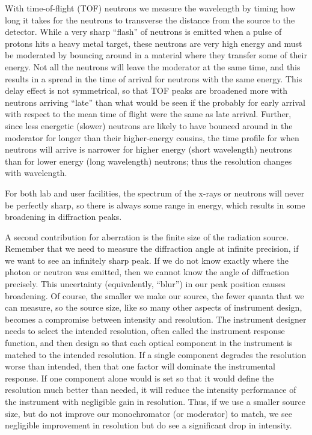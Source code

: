  With time-of-flight (TOF) neutrons we measure the wavelength by timing how long it takes for the neutrons to transverse the distance from the source to the detector. While a very sharp “flash” of neutrons is emitted when a pulse of protons hits a heavy metal target, these neutrons are very high energy and must be moderated by bouncing around in a material where they transfer some of their energy. Not all the neutrons will leave the moderator at the same time, and this results in a spread in the time of arrival for neutrons with the same energy. This delay effect is not symmetrical, so that TOF peaks are broadened more with neutrons arriving “late” than what would be seen if the probably for early arrival with respect to the mean time of flight were the same as late arrival. Further, since less energetic (slower) neutrons are likely to have bounced around in the moderator for longer than their higher-energy cousins, the time profile for when neutrons will arrive is narrower for higher energy (short wavelength) neutrons than for lower energy (long wavelength) neutrons; thus the resolution changes with wavelength.

 For both lab and user facilities, the spectrum of the x-rays or neutrons will never be perfectly sharp, so there is always some range in energy, which results in some broadening in diffraction peaks.

 A second contribution for aberration is the finite size of the radiation source. Remember that we need to measure the diffraction angle at infinite precision, if we want to see an infinitely sharp peak. If we do not know exactly where the photon or neutron was emitted, then we cannot know the angle of diffraction precisely. This uncertainty (equivalently, “blur”) in our peak position causes broadening. Of course, the smaller we make our source, the fewer quanta that we can measure, so the source size, like so many other aspects of instrument design, becomes a compromise between intensity and resolution. The instrument designer needs to select the intended resolution, often called the instrument response function, and then design so that each optical component in the instrument is matched to the intended resolution. If a single component degrades the resolution worse than intended, then that one factor will dominate the instrumental response. If one component alone would is set so that it would define the resolution much better than needed, it will reduce the intensity performance of the instrument with negligible gain in resolution. Thus, if we use a smaller source size, but do not improve our monochromator (or moderator) to match, we see negligible improvement in resolution but do see a significant drop in intensity. 

